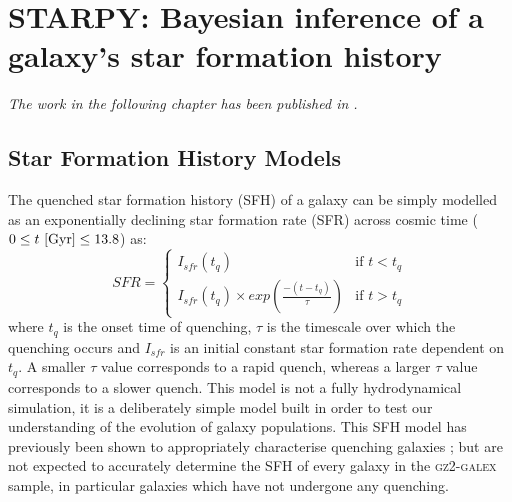 \chapter{STARPY: Bayesian inference of a galaxy's star formation history}\label{chap:starpy}

\emph{The work in the following chapter has been published in \citet{smethurst15}.}
\\

\section{Star Formation History Models}\label{qmod}

The quenched star formation history (SFH) of a galaxy can be simply modelled as an exponentially declining star formation rate (SFR) across cosmic time ($0 \leq t ~\rm{[Gyr]} \leq 13.8$) as:
\begin{equation}\label{sfh}
SFR =
\begin{cases}
I_{sfr}(t_q) & \text{if } t < t_q \\
I_{sfr}(t_q) \times exp{\left( \frac{-(t-t_{q})}{\tau}\right)} & \text{if } t > t_q 
\end{cases}
\end{equation}
where $t_{q}$ is the onset time of quenching, $\tau$ is the timescale over which the quenching occurs and $I_{sfr}$ is an initial constant star formation rate dependent on $t_q$.  A smaller $\tau$ value corresponds to a rapid quench, whereas a larger $\tau$ value corresponds to a slower quench. This model is not a fully hydrodynamical simulation, it is a deliberately simple model built in order to test our understanding of the evolution of galaxy populations. This SFH model has previously been shown to appropriately characterise quenching galaxies \citep{weiner06, Martin07, Noeske07,schawinski14}; but are not expected to accurately determine the SFH of every galaxy in the \textsc{gz2-galex} sample, in particular galaxies which have not undergone any quenching. 

